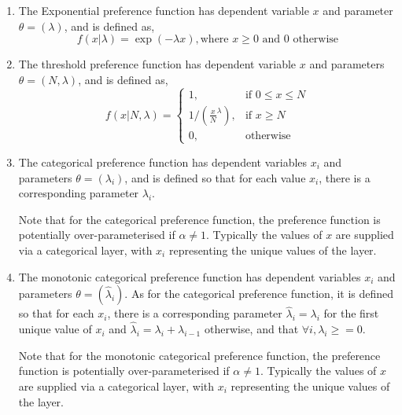 \begin{enumerate}
\item The Exponential preference function has dependent variable $x$ and parameter $\theta = (\lambda)$, and is defined as,
\begin{equation}
  f(x | \lambda) =\exp(-\lambda x), \text{where $x \geq 0$ and $0$ otherwise}
\end{equation}

\item The threshold preference function has dependent variable $x$ and parameters $\theta = (N,\lambda)$, and is defined as,
\begin{equation}
  f(x | N, \lambda) = \begin{cases}
    1, & \text{if $0 \le x \leq N$} \\
    1/\left({\frac{x}{N}}^\lambda\right), & \text{if $x \ge N$}\\
    0, & \text{otherwise}
  \end{cases}
\end{equation}

\item The categorical preference function has dependent variables $x_i$ and parameters $\theta = (\lambda_i)$, and is defined so that for each value $x_i$, there is a corresponding parameter $\lambda_i$. 

Note that for the categorical preference function, the preference function is potentially over-parameterised if $\alpha \ne 1$. Typically the values of $x$ are supplied via a categorical layer, with $x_i$ representing the unique values of the layer.

\item The monotonic categorical preference function has dependent variables $x_i$ and parameters $\theta = (\hat{\lambda}_i)$. As for the categorical preference function, it is defined so that for each $x_i$, there is a corresponding parameter $\hat{\lambda}_i = \lambda_i$ for the first unique value of $x_i$ and  $\hat{\lambda}_i = \lambda_i+ \lambda_{i-1}$ otherwise, and that $\forall{i}, \lambda_i \ge=0 $.

Note that for the monotonic categorical preference function, the preference function is potentially over-parameterised if $\alpha \ne 1$. Typically the values of $x$ are supplied via a categorical layer, with $x_i$ representing the unique values of the layer.

\end{enumerate}

